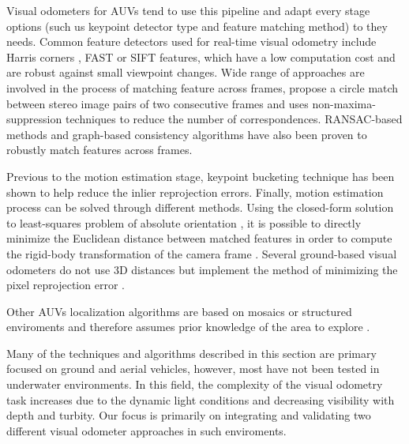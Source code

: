 \documentclass[conference]{IEEEtran}
\begin{document}
Visual odometers for AUVs tend to use this pipeline \cite{Botelho2009} and adapt every stage options (such us keypoint detector type and feature matching method) to they needs. Common feature detectors used for real-time visual odometry include Harris corners \cite{Harris1988} \cite{Nister2006}, FAST \cite{Rosten2006} \cite{Huang2011} or SIFT \cite{Lowe2004} \cite{Botelho2009} features, which have a low computation cost and are robust against small viewpoint changes. Wide range of approaches are involved in the process of matching feature across frames, \cite{Geiger2011} propose a circle match between stereo image pairs of two consecutive frames and uses non-maxima-suppression techniques \cite{Geiger2010} to reduce the number of correspondences. RANSAC-based methods \cite{Nister2004} \cite{Johnson2008} and graph-based consistency algorithms \cite{Howard2008} have also been proven to robustly match features across frames.

Previous to the motion estimation stage, keypoint bucketing technique \cite{Zhang1995} has been shown to help reduce the inlier reprojection errors. Finally, motion estimation process can be solved through different methods. Using the closed-form solution to least-squares problem of absolute orientation \cite{Horn1987}, it is possible to directly minimize the Euclidean distance between matched features in order to compute the rigid-body transformation of the camera frame \cite{Huang2011}. Several ground-based visual odometers do not use 3D distances but implement the method of minimizing the pixel reprojection error \cite{Howard2008} \cite{Geiger2011}. 

Other AUVs localization algorithms are based on mosaics or structured enviroments and therefore assumes prior knowledge of the area to explore \cite{Garcia2001} \cite{Gracias2003} \cite{Carreras2003}.

Many of the techniques and algorithms described in this section are primary focused on ground and aerial vehicles, however, most have not been tested in underwater environments. In this field, the complexity of the visual odometry task increases due to the dynamic light conditions and decreasing visibility with depth and turbity. Our focus is primarily on integrating and validating two different visual odometer approaches in such enviroments.
\end{document}
